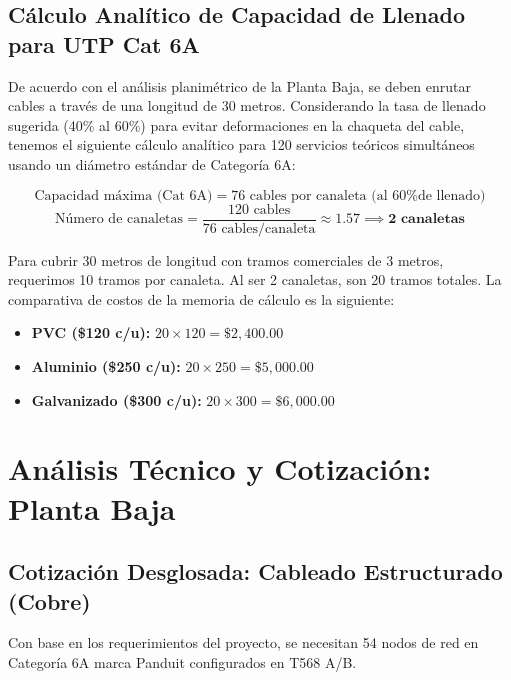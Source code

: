 \documentclass[11pt, letterpaper]{article}
\begin{document}
\subsection{Cálculo Analítico de Capacidad de Llenado para UTP Cat 6A}
De acuerdo con el análisis planimétrico de la Planta Baja, se deben enrutar cables a través de una longitud de 30 metros. Considerando la tasa de llenado sugerida (40\% al 60\%) para evitar deformaciones en la chaqueta del cable, tenemos el siguiente cálculo analítico para 120 servicios teóricos simultáneos usando un diámetro estándar de Categoría 6A:

\begin{equation}
    \text{Capacidad máxima (Cat 6A)} = 76 \text{ cables por canaleta (al 60\% de llenado)}
\end{equation}
\begin{equation}
    \text{Número de canaletas} = \frac{120 \text{ cables}}{76 \text{ cables/canaleta}} \approx 1.57 \implies \mathbf{2 \text{ canaletas}}
\end{equation}

Para cubrir 30 metros de longitud con tramos comerciales de 3 metros, requerimos 10 tramos por canaleta. Al ser 2 canaletas, son 20 tramos totales. La comparativa de costos de la memoria de cálculo es la siguiente:
\begin{itemize}
    \item \textbf{PVC (\$120 c/u):} $20 \times 120 = \$ 2,400.00$
    \item \textbf{Aluminio (\$250 c/u):} $20 \times 250 = \$ 5,000.00$
    \item \textbf{Galvanizado (\$300 c/u):} $20 \times 300 = \$ 6,000.00$
\end{itemize}

\section{Análisis Técnico y Cotización: Planta Baja}

\subsection{Cotización Desglosada: Cableado Estructurado (Cobre)}
Con base en los requerimientos del proyecto, se necesitan 54 nodos de red en Categoría 6A marca Panduit configurados en T568 A/B.
\end{document}

